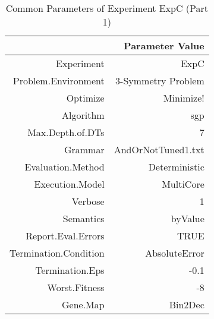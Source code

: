 \begin{table}[ht]
\centering
\begin{tabular}{rr}
  \hline
 & Parameter Value \\ 
  \hline
Experiment & ExpC \\ 
  Problem.Environment & 3-Symmetry Problem \\ 
  Optimize & Minimize! \\ 
  Algorithm & sgp \\ 
  Max.Depth.of.DTs & 7 \\ 
  Grammar & AndOrNotTuned1.txt \\ 
  Evaluation.Method & Deterministic \\ 
  Execution.Model & MultiCore \\ 
  Verbose & 1 \\ 
  Semantics & byValue \\ 
  Report.Eval.Errors & TRUE \\ 
  Termination.Condition & AbsoluteError \\ 
  Termination.Eps & -0.1 \\ 
  Worst.Fitness & -8 \\ 
  Gene.Map & Bin2Dec \\ 
   \hline
\end{tabular}
\caption{Common Parameters of Experiment ExpC (Part 1)} 
\end{table}
